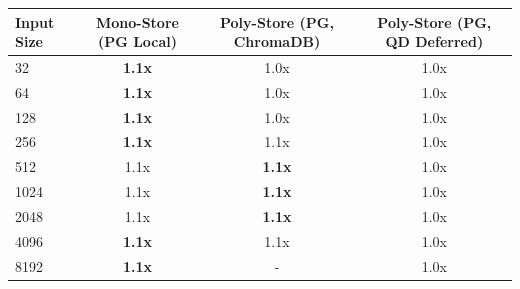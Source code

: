 \begin{tabular}{lccc}
\toprule
\textbf{Input Size} & \textbf{Mono-Store (PG Local)} & \textbf{Poly-Store (PG, ChromaDB)} & \textbf{Poly-Store (PG, QD Deferred)} \\
\midrule
32 & \textbf{1.1x} & 1.0x & 1.0x \\
64 & \textbf{1.1x} & 1.0x & 1.0x \\
128 & \textbf{1.1x} & 1.0x & 1.0x \\
256 & \textbf{1.1x} & 1.1x & 1.0x \\
512 & 1.1x & \textbf{1.1x} & 1.0x \\
1024 & 1.1x & \textbf{1.1x} & 1.0x \\
2048 & 1.1x & \textbf{1.1x} & 1.0x \\
4096 & \textbf{1.1x} & 1.1x & 1.0x \\
8192 & \textbf{1.1x} & - & 1.0x \\
\bottomrule
\end{tabular}
